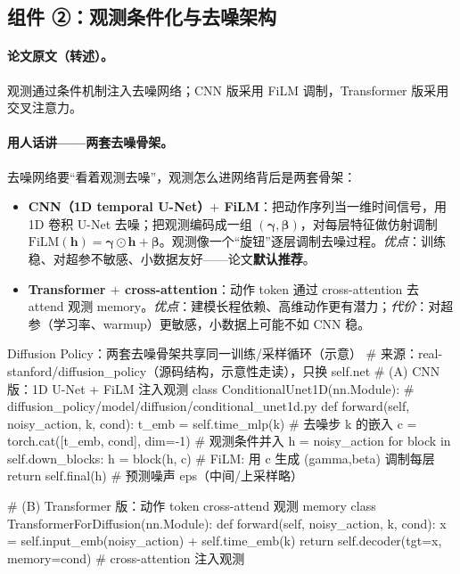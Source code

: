 \subsection{组件 ②：观测条件化与去噪架构}
\label{sec:de-condition}

\paragraph{论文原文（转述）。}
观测通过条件机制注入去噪网络；CNN 版采用 FiLM 调制，Transformer 版采用交叉注意力\cite{chi2023diffusion}。

\paragraph{用人话讲——两套去噪骨架。}
去噪网络要“看着观测去噪”，观测怎么进网络背后是两套骨架：
\begin{itemize}
  \item \textbf{CNN（1D temporal U-Net）$+$ FiLM}：把动作序列当一维时间信号，用 1D 卷积 U-Net 去噪；把观测编码成一组 $(\boldsymbol{\gamma},\boldsymbol{\beta})$，对每层特征做仿射调制 $\mathrm{FiLM}(\mathbf{h})=\boldsymbol{\gamma}\odot\mathbf{h}+\boldsymbol{\beta}$。观测像一个“旋钮”逐层调制去噪过程。\emph{优点}：训练稳、对超参不敏感、小数据友好——论文\textbf{默认推荐}。
  \item \textbf{Transformer $+$ cross-attention}：动作 token 通过 cross-attention 去 attend 观测 memory。\emph{优点}：建模长程依赖、高维动作更有潜力；\emph{代价}：对超参（学习率、warmup）更敏感，小数据上可能不如 CNN 稳。
\end{itemize}

\begin{codebox}[Python]{Diffusion Policy：两套去噪骨架共享同一训练/采样循环（示意）}
# 来源：real-stanford/diffusion_policy（源码结构，示意性走读），只换 self.net
# (A) CNN 版：1D U-Net + FiLM 注入观测
class ConditionalUnet1D(nn.Module):       # diffusion_policy/model/diffusion/conditional_unet1d.py
    def forward(self, noisy_action, k, cond):
        t_emb = self.time_mlp(k)               # 去噪步 k 的嵌入
        c = torch.cat([t_emb, cond], dim=-1)   # 观测条件并入
        h = noisy_action
        for block in self.down_blocks:
            h = block(h, c)                    # FiLM: 用 c 生成 (gamma,beta) 调制每层
        return self.final(h)                   # 预测噪声 eps（中间/上采样略）

# (B) Transformer 版：动作 token cross-attend 观测 memory
class TransformerForDiffusion(nn.Module):
    def forward(self, noisy_action, k, cond):
        x = self.input_emb(noisy_action) + self.time_emb(k)
        return self.decoder(tgt=x, memory=cond)  # cross-attention 注入观测
\end{codebox}

